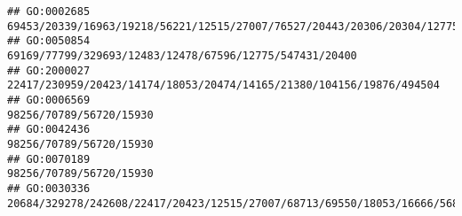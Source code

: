\documentclass[
]{article}
\begin{document}
\begin{verbatim}
## GO:0002685                                                                                                                                                                                                                                                                                           69453/20339/16963/19218/56221/12515/27007/76527/20443/20306/20304/12775/56838/110168/11815/12458/11629/16149/12766
## GO:0050854                                                                                                                                                                                                                                                                                                                                                      69169/77799/329693/12483/12478/67596/12775/547431/20400
## GO:2000027                                                                                                                                                                                                                                                                                                                                         22417/230959/20423/14174/18053/20474/14165/21380/104156/19876/494504
## GO:0006569                                                                                                                                                                                                                                                                                                                                                                                      98256/70789/56720/15930
## GO:0042436                                                                                                                                                                                                                                                                                                                                                                                      98256/70789/56720/15930
## GO:0070189                                                                                                                                                                                                                                                                                                                                                                                      98256/70789/56720/15930
## GO:0030336                                                                                                                                                                                                                                                                     20684/329278/242608/22417/20423/12515/27007/68713/69550/18053/16666/56838/13134/110168/57277/106014/11815/19876/11629/13078/16149/170942

\end{verbatim}
\end{document}
